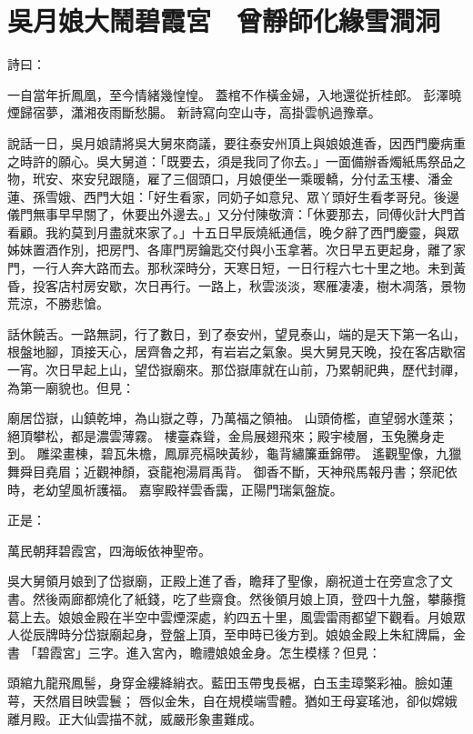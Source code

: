 %

\chapter{吳月娘大鬧碧霞宮　曾靜師化緣雪澗洞}

詩曰：

一自當年折鳳凰，至今情緒幾惶惶。
蓋棺不作橫金婦，入地還從折桂郎。
彭澤曉煙歸宿夢，瀟湘夜雨斷愁腸。
新詩寫向空山寺，高掛雲帆過豫章。

說話一日，吳月娘請將吳大舅來商議，要往泰安州頂上與娘娘進香，因西門慶病重之時許的願心。吳大舅道：「既要去，須是我同了你去。」一面備辦香燭紙馬祭品之物，玳安、來安兒跟隨，雇了三個頭口，月娘便坐一乘暖轎，分付孟玉樓、潘金蓮、孫雪娥、西門大姐：「好生看家，同奶子如意兒、眾丫頭好生看孝哥兒。後邊儀門無事早早關了，休要出外邊去。」又分付陳敬濟：「休要那去，同傅伙計大門首看顧。我約莫到月盡就來家了。」十五日早辰燒紙通信，晚夕辭了西門慶靈，與眾姊妹置酒作別，把房門、各庫門房鑰匙交付與小玉拿著。次日早五更起身，離了家門，一行人奔大路而去。那秋深時分，天寒日短，一日行程六七十里之地。未到黃昏，投客店村房安歇，次日再行。一路上，秋雲淡淡，寒雁凄凄，樹木凋落，景物荒涼，不勝悲愴。

話休饒舌。一路無詞，行了數日，到了泰安州，望見泰山，端的是天下第一名山，根盤地腳，頂接天心，居齊魯之邦，有岩岩之氣象。吳大舅見天晚，投在客店歇宿一宵。次日早起上山，望岱嶽廟來。那岱嶽庫就在山前，乃累朝祀典，歷代封禪，為第一廟貌也。但見：

廟居岱嶽，山鎮乾坤，為山嶽之尊，乃萬福之領袖。 山頭倚檻，直望弱水蓬萊；絕頂攀松，都是濃雲薄霧。 樓臺森聳，金烏展翅飛來；殿宇棱層，玉兔騰身走到。 雕梁畫棟，碧瓦朱檐，鳳扉亮槅映黃紗，龜背繡簾垂錦帶。 遙觀聖像，九獵舞舜目堯眉；近觀神顏，袞龍袍湯肩禹背。 御香不斷，天神飛馬報丹書；祭祀依時，老幼望風祈護福。 嘉寧殿祥雲香靄，正陽門瑞氣盤旋。

正是：

萬民朝拜碧霞宮，四海皈依神聖帝。

吳大舅領月娘到了岱嶽廟，正殿上進了香，瞻拜了聖像，廟祝道士在旁宣念了文書。然後兩廊都燒化了紙錢，吃了些齋食。然後領月娘上頂，登四十九盤，攀藤攬葛上去。娘娘金殿在半空中雲煙深處，約四五十里，風雲雷雨都望下觀看。月娘眾人從辰牌時分岱嶽廟起身，登盤上頂，至申時已後方到。娘娘金殿上朱紅牌扁，金書 「碧霞宮」三字。進入宮內，瞻禮娘娘金身。怎生模樣？但見：

頭綰九龍飛鳳髻，身穿金縷絳綃衣。藍田玉帶曳長裾，白玉圭璋檠彩袖。臉如蓮萼，天然眉目映雲鬟； 唇似金朱，自在規模端雪體。猶如王母宴瑤池，卻似嫦娥離月殿。正大仙雲描不就，威嚴形象畫難成。

